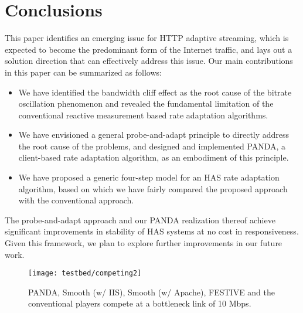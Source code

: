 \documentclass[conference]{IEEEtran}
\theoremstyle{plain}
\theoremstyle{definition}
\theoremstyle{plain}
\theoremstyle{plain}
\begin{document}
\section{Conclusions\label{sec:Conclusions}}

This paper identifies an emerging issue for HTTP adaptive streaming,
which is expected to become the predominant form of the Internet traffic,
and lays out a solution direction that can effectively address this
issue. Our main contributions in this paper can be summarized as follows:
\begin{itemize}
\item We have identified the bandwidth cliff effect as the root cause of
the bitrate oscillation phenomenon and revealed the fundamental limitation
of the conventional reactive measurement based rate adaptation algorithms.
\item We have envisioned a general probe-and-adapt principle to directly
address the root cause of the problems, and designed and implemented
PANDA, a client-based rate adaptation algorithm, as an embodiment
of this principle.
\item We have proposed a generic four-step model for an HAS rate adaptation
algorithm, based on which we have fairly compared the proposed approach
with the conventional approach.
\end{itemize}
The probe-and-adapt approach and our PANDA realization thereof achieve
significant improvements in stability of HAS systems at no cost in
responsiveness. Given this framework, we plan to explore further improvements
in our future work.

\begin{figure}
\begin{centering}
\hspace{-0.40in}\begin{minipage}[t]{1\columnwidth}\begin{center}
\texttt{[image: testbed/competing2]}
\par\end{center}\end{minipage} 
\par\end{centering}

\vspace{-0.01in}\caption{PANDA, Smooth (w/ IIS), Smooth (w/ Apache), FESTIVE and the conventional
players compete at a bottleneck link of 10 Mbps.}


\label{Flo:competing} \vspace{-0.05in}
\end{figure}
\end{document}
